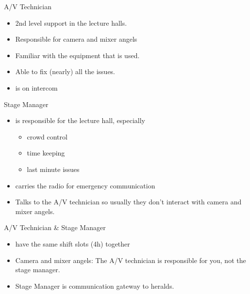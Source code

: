 \documentclass[aspectratio=169]{beamer}
\begin{document}
\begin{frame}{A/V Technician}
	\begin{itemize}
		\item 2nd level support in the lecture halls. 
		\item Responsible for camera and mixer angels
		\item Familiar with the equipment that is used. 
		\item Able to fix (nearly) all the issues. 
		\item is on intercom %
	\end{itemize}
\end{frame}


\begin{frame}{Stage Manager}
\begin{itemize}
	\item is responsible for the lecture hall, especially
	\begin{itemize}
		\item crowd control
		\item time keeping
		\item last minute issues 
	\end{itemize}
	\item carries the radio for emergency communication
	\item Talks to the A/V technician so usually they don't  interact with camera and mixer angels.
\end{itemize}
\end{frame}

\begin{frame}{A/V Technician \& Stage Manager}
\begin{itemize}
	\item have the same shift slots (4h) together
	\item Camera and mixer angels: The A/V technician is responsible for you, not the stage manager.
	\item Stage Manager is communication gateway to heralds.
\end{itemize}
\end{frame}
\end{document}

